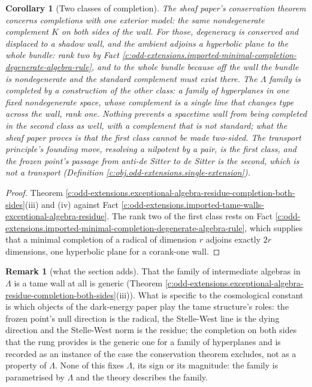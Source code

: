 \documentclass[11pt]{article}
\newtheorem{corollary}[theorem]{Corollary}
\theoremstyle{definition}
\newtheorem{remark}[theorem]{Remark}
\theoremstyle{plain}
\newcommand{\changedmark}[2]{\marginpar{\raggedright\scriptsize\color{#1}#2}}
\begin{document}
\begin{corollary}[Two classes of completion]\label{c:odd-extensions.two-classes-completion}
\changedmark{gray}{reworded}
The sheaf paper's conservation theorem concerns completions with one exterior model: the same nondegenerate complement $K$ on both sides of the wall. For those, degeneracy is conserved and displaced to a shadow wall, and the ambient adjoins a hyperbolic plane to the whole bundle: rank two by Fact \ref{c:odd-extensions.imported-minimal-completion-degenerate-algebra-rule}, and to the whole bundle because off the wall the bundle is nondegenerate and the standard complement must exist there. The $\Lambda$ family is completed by a construction of the other class: a family of hyperplanes in one fixed nondegenerate space, whose complement is a single line that changes type across the wall, rank one. Nothing prevents a spacetime wall from being completed in the second class as well, with a complement that is not standard; what the sheaf paper proves is that the first class cannot be made two-sided. The transport principle's founding move, resolving a nilpotent by a pair, is the first class, and the frozen point's passage from anti-de Sitter to de Sitter is the second, which is not a transport (Definition \ref{c:obj.odd-extensions.single-extension}).
\end{corollary}
\begin{proof}
Theorem \ref{c:odd-extensions.exceptional-algebra-residue-completion-both-sides}(iii) and (iv) against Fact \ref{c:odd-extensions.imported-tame-walls-exceptional-algebra-residue}. The rank two of the first class rests on Fact \ref{c:odd-extensions.imported-minimal-completion-degenerate-algebra-rule}, which supplies that a minimal completion of a radical of dimension $r$ adjoins exactly $2r$ dimensions, one hyperbolic plane for a corank-one wall.

\end{proof}

\begin{remark}[what the section adds]\label{c:note.odd-extensions.what-section-adds}
That the family of intermediate algebras in $\Lambda$ is a tame wall at all is generic (Theorem \ref{c:odd-extensions.exceptional-algebra-residue-completion-both-sides}(iii)). What is specific to the cosmological constant is which objects of the dark-energy paper play the tame structure's roles: the frozen point's null direction is the radical, the Stelle-West line is the dying direction and the Stelle-West norm is the residue; the completion on both sides that the rung provides is the generic one for a family of hyperplanes and is recorded as an instance of the case the conservation theorem excludes, not as a property of $\Lambda$. None of this fixes $\Lambda$, its sign or its magnitude: the family is parametrised by $\Lambda$ and the theory describes the family.
\end{remark}
\end{document}
